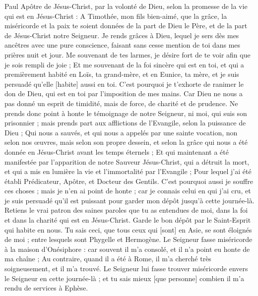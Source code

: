 \BFont
\begin{multicols}{2}
\VerseOne{}Paul Apôtre de Jésus-Christ, par la volonté de Dieu, selon la promesse de la vie qui est en Jésus-Christ :
A Timothée, mon fils bien-aimé, que la grâce, la miséricorde et la paix te soient données de la part de Dieu le Père, et de la part de Jésus-Christ notre Seigneur.
Je rends grâces à Dieu, lequel je sers dès mes ancêtres avec une pure conscience, faisant sans cesse mention de toi dans mes prières nuit et jour.
Me souvenant de tes larmes, je désire fort de te voir afin que je sois rempli de joie ;
Et me souvenant de la foi sincère qui est en toi, et qui a premièrement habité en Loïs, ta grand-mère, et en Eunice, ta mère, et je suis persuadé qu'elle [habite] aussi en toi.
C'est pourquoi je t'exhorte de ranimer le don de Dieu, qui est en toi par l'imposition de mes mains.
Car Dieu ne nous a pas donné un esprit de timidité, mais de force, de charité et de prudence.
Ne prends donc point à honte le témoignage de notre Seigneur, ni moi, qui suis son prisonnier ; mais prends part aux afflictions de l'Evangile, selon la puissance de Dieu ;
Qui nous a sauvés, et qui nous a appelés par une sainte vocation, non selon nos œuvres, mais selon son propre dessein, et selon la grâce qui nous a été donnée en Jésus-Christ avant les temps éternels ;
Et qui maintenant a été manifestée par l'apparition de notre Sauveur Jésus-Christ, qui a détruit la mort, et qui a mis en lumière la vie et l'immortalité par l'Evangile ;
Pour lequel j'ai été établi Prédicateur, Apôtre, et Docteur des Gentils.
C'est pourquoi aussi je souffre ces choses ; mais je n'en ai point de honte ; car je connais celui en qui j'ai cru, et je suis persuadé qu'il est puissant pour garder mon dépôt jusqu'à cette journée-là.
Retiens le vrai patron des saines paroles que tu as entendues de moi, dans la foi et dans la charité qui est en Jésus-Christ.
Garde le bon dépôt par le Saint-Esprit qui habite en nous.
Tu sais ceci, que tous ceux qui [sont] en Asie, se sont éloignés de moi ; entre lesquels sont Phygelle et Hermogène.
Le Seigneur fasse miséricorde à la maison d'Onésiphore : car souvent il m'a consolé, et il n'a point eu honte de ma chaîne ;
Au contraire, quand il a été à Rome, il m'a cherché très soigneusement, et il m'a trouvé.
Le Seigneur lui fasse trouver miséricorde envers le Seigneur en cette journée-là ; et tu sais mieux [que personne] combien il m'a rendu de services à Ephèse.

\end{multicols}
